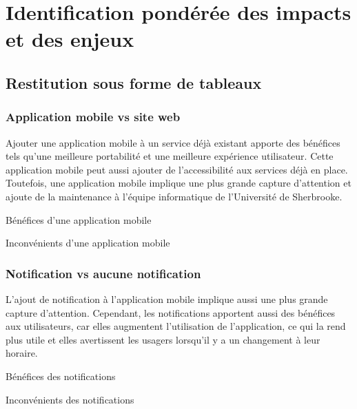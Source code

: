 \section{Identification pondérée des impacts et des enjeux}
	\subsection{Restitution sous forme de tableaux}
		\subsubsection{Application mobile vs site web}
		Ajouter une application mobile à un service déjà existant apporte des bénéfices tels qu’une meilleure portabilité et une meilleure expérience utilisateur. Cette application mobile peut aussi ajouter de l’accessibilité aux services déjà en place. Toutefois, une application mobile implique une plus grande capture d’attention et ajoute de la maintenance à l’équipe informatique de l’Université de Sherbrooke. 
	
		\begin{sidewaystable}[p]
			\centering
			\caption{Bénéfices d'une application mobile}
			\label{tab.app+}
			
		\bigskip\bigskip
			\centering
			\caption{Inconvénients d'une application mobile}
			\label{tab.app-}
			
		\end{sidewaystable}
		
		\subsubsection{Notification vs aucune notification}
		L’ajout de notification à l’application mobile implique aussi une plus grande capture d’attention. Cependant, les notifications apportent aussi des bénéfices aux utilisateurs, car elles augmentent l’utilisation de l’application, ce qui la rend plus utile et elles avertissent les usagers lorsqu’il y a un changement à leur horaire. 
	
		\begin{sidewaystable}[p]
			\centering
			\caption{Bénéfices des notifications}
			\label{tab.notif+}
			
		\bigskip\bigskip
			\centering
			\caption{Inconvénients des notifications}
			\label{tab.notif-}
			
		\end{sidewaystable}
		
